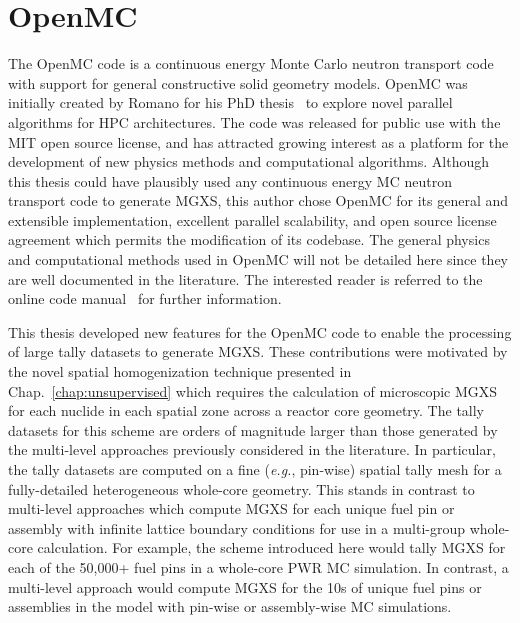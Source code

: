 

\section{OpenMC}
\label{sec:chap4-openmc}

The OpenMC code is a continuous energy Monte Carlo neutron transport code~\cite{romano2013openmc} with support for general constructive solid geometry models. OpenMC was initially created by Romano for his PhD thesis~\cite{romano2013parallel} to explore novel parallel algorithms for \ac{HPC} architectures. The code was released for public use with the MIT open source license, and has attracted growing interest as a platform for the development of new physics methods and computational algorithms. Although this thesis could have plausibly used any continuous energy \ac{MC} neutron transport code to generate \ac{MGXS}, this author chose OpenMC for its general and extensible implementation, excellent parallel scalability, and open source license agreement which permits the modification of its codebase. The general physics and computational methods used in OpenMC will not be detailed here since they are well documented in the literature. The interested reader is referred to the online code manual~\cite{openmc2016manual} for further information.

This thesis developed new features for the OpenMC code to enable the processing of large tally datasets to generate \ac{MGXS}. These contributions were motivated by the novel spatial homogenization technique presented in Chap.~\ref{chap:unsupervised} which requires the calculation of microscopic \ac{MGXS} for each nuclide in each spatial zone across a reactor core geometry. The tally datasets for this scheme are orders of magnitude larger than those generated by the multi-level approaches previously considered in the literature. In particular, the tally datasets are computed on a fine (\textit{e.g.}, pin-wise) spatial tally mesh for a fully-detailed heterogeneous whole-core geometry. This stands in contrast to multi-level approaches which compute \ac{MGXS} for each unique fuel pin or assembly with infinite lattice boundary conditions for use in a multi-group whole-core calculation. For example, the scheme introduced here would tally \ac{MGXS} for each of the 50,000+ fuel pins in a whole-core \ac{PWR} \ac{MC} simulation. In contrast, a multi-level approach would compute \ac{MGXS} for the 10s of unique fuel pins or assemblies in the model with pin-wise or assembly-wise \ac{MC} simulations.

